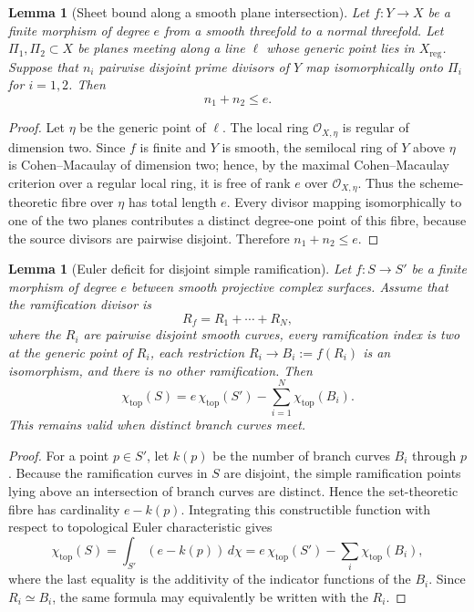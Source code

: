 \documentclass[11pt,reqno]{amsart}
\newtheorem{lemma}[theorem]{Lemma}
\theoremstyle{remark}
\newcommand{\cO}{\mathcal O}
\begin{document}
\begin{lemma}[Sheet bound along a smooth plane intersection]\label{lem:r36sheet}
Let $f:Y\to X$ be a finite morphism of degree $e$ from a smooth threefold to a normal threefold.  Let $\Pi_1,\Pi_2\subset X$ be planes meeting along a line $\ell$ whose generic point lies in $X_{\mathrm{reg}}$.  Suppose that $n_i$ pairwise disjoint prime divisors of $Y$ map isomorphically onto $\Pi_i$ for $i=1,2$.  Then
\[
n_1+n_2\le e.
\]
\end{lemma}

\begin{proof}
Let $\eta$ be the generic point of $\ell$.  The local ring $\cO_{X,\eta}$ is regular of dimension two.  Since $f$ is finite and $Y$ is smooth, the semilocal ring of $Y$ above $\eta$ is Cohen--Macaulay of dimension two; hence, by the maximal Cohen--Macaulay criterion over a regular local ring, it is free of rank $e$ over $\cO_{X,\eta}$.  Thus the scheme-theoretic fibre over $\eta$ has total length $e$.  Every divisor mapping isomorphically to one of the two planes contributes a distinct degree-one point of this fibre, because the source divisors are pairwise disjoint.  Therefore $n_1+n_2\le e$.
\end{proof}

\begin{lemma}[Euler deficit for disjoint simple ramification]\label{lem:eulerdeficit}
Let $f:S\to S'$ be a finite morphism of degree $e$ between smooth projective complex surfaces.  Assume that the ramification divisor is
\[
R_f=R_1+\cdots+R_N,
\]
where the $R_i$ are pairwise disjoint smooth curves, every ramification index is two at the generic point of $R_i$, each restriction $R_i\to B_i:=f(R_i)$ is an isomorphism, and there is no other ramification.  Then
\[
\chi_{\mathrm{top}}(S)=e\,\chi_{\mathrm{top}}(S')-\sum_{i=1}^N\chi_{\mathrm{top}}(B_i).
\]
This remains valid when distinct branch curves meet.
\end{lemma}

\begin{proof}
For a point $p\in S'$, let $k(p)$ be the number of branch curves $B_i$ through $p$.  Because the ramification curves in $S$ are disjoint, the simple ramification points lying above an intersection of branch curves are distinct.  Hence the set-theoretic fibre has cardinality $e-k(p)$.  Integrating this constructible function with respect to topological Euler characteristic gives
\[
\chi_{\mathrm{top}}(S)=\int_{S'}(e-k(p))\,d\chi
=e\,\chi_{\mathrm{top}}(S')-\sum_i\chi_{\mathrm{top}}(B_i),
\]
where the last equality is the additivity of the indicator functions of the $B_i$.  Since $R_i\simeq B_i$, the same formula may equivalently be written with the $R_i$.
\end{proof}
\end{document}
